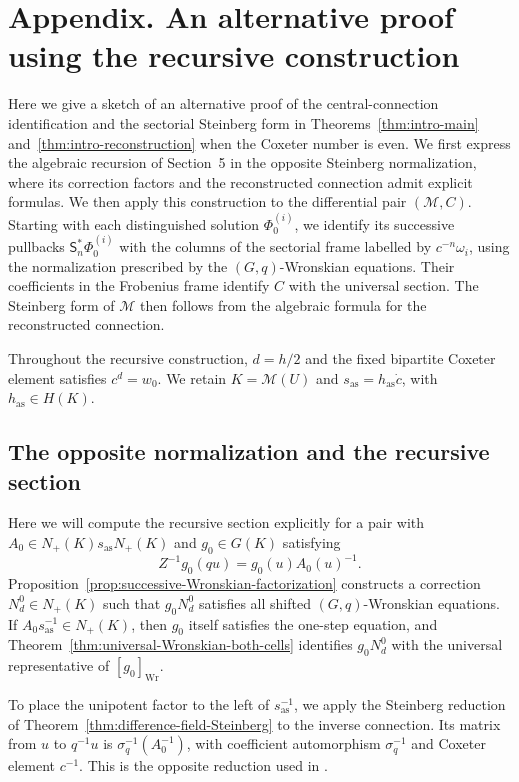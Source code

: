 \documentclass[11pt,leqno]{amsart}
\numberwithin{equation}{section}
\theoremstyle{plain}
\theoremstyle{definition}
\theoremstyle{plain}
\theoremstyle{definition}
\theoremstyle{remark}
\begin{document}
\section*{Appendix. An alternative proof using the recursive construction}\label{sec:opposite-normal-form}
Here we give a sketch of an alternative proof of the central-connection identification and the sectorial Steinberg form in Theorems~\ref{thm:intro-main} and~\ref{thm:intro-reconstruction} when the Coxeter number is even.  We first express the algebraic recursion of Section~5 in the opposite Steinberg normalization, where its correction factors and the reconstructed connection admit explicit formulas.  We then apply this construction to the differential pair $(\mathscr M,C)$.  Starting with each distinguished solution $\Phi_0^{(i)}$, we identify its successive pullbacks $\mathsf S_n^*\Phi_0^{(i)}$ with the columns of the sectorial frame labelled by $c^{-n}\omega_i$, using the normalization prescribed by the $(G,q)$-Wronskian equations.  Their coefficients in the Frobenius frame identify $C$ with the universal section.  The Steinberg form of $\mathscr M$ then follows from the algebraic formula for the reconstructed connection.

Throughout the recursive construction, $d=h/2$ and the fixed bipartite Coxeter element satisfies $c^d=w_0$.  We retain $K=\mathcal M(U)$ and $s_{\mathrm{as}}=h_{\mathrm{as}}\dot c$, with $h_{\mathrm{as}}\in H(K)$.

\subsection{The opposite normalization and the recursive section}
Here we will compute the recursive section explicitly for a pair with $A_0\in N_+(K)s_{\mathrm{as}}N_+(K)$ and $g_0\in G(K)$ satisfying
\[
 Z^{-1}g_0(qu)=g_0(u)A_0(u)^{-1}.
\]
Proposition~\ref{prop:successive-Wronskian-factorization} constructs a correction $N_d^0\in N_+(K)$ such that $g_0N_d^0$ satisfies all shifted $(G,q)$-Wronskian equations.  If $A_0s_{\mathrm{as}}^{-1}\in N_+(K)$, then $g_0$ itself satisfies the one-step equation, and Theorem~\ref{thm:universal-Wronskian-both-cells} identifies $g_0N_d^0$ with the universal representative of $[g_0]_{\mathrm{Wr}}$.

To place the unipotent factor to the left of $s_{\mathrm{as}}^{-1}$, we apply the Steinberg reduction of Theorem~\ref{thm:difference-field-Steinberg} to the inverse connection.  Its matrix from $u$ to $q^{-1}u$ is $\sigma_q^{-1}(A_0^{-1})$, with coefficient automorphism $\sigma_q^{-1}$ and Coxeter element $c^{-1}$.  This is the opposite reduction used in \cite[Proposition~4.20]{KZ2021}.
\end{document}
